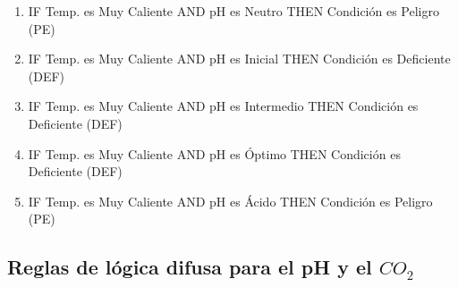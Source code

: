 \begin{enumerate}
\item IF Temp. es Muy Caliente AND pH es Neutro THEN Condición es Peligro (PE)
\item IF Temp. es Muy Caliente AND pH es Inicial THEN Condición es Deficiente (DEF)
\item IF Temp. es Muy Caliente AND pH es Intermedio THEN Condición es Deficiente (DEF)
\item IF Temp. es Muy Caliente AND pH es Óptimo THEN Condición es Deficiente (DEF)
\item IF Temp. es Muy Caliente AND pH es Ácido THEN Condición es Peligro (PE)

\end{enumerate}


\subsection{Reglas de lógica difusa para el pH y el $CO_{2}$}

